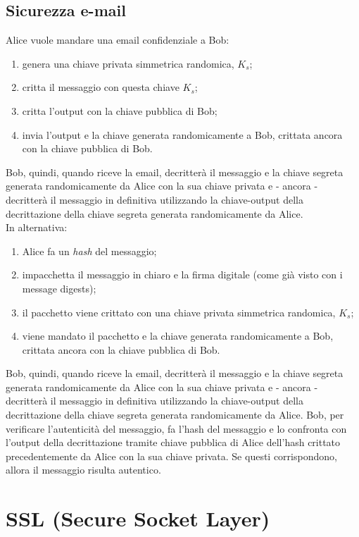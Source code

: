 \subsection{Sicurezza e-mail}
Alice vuole mandare una email confidenziale a Bob:
\begin{enumerate}
	\item genera una chiave privata simmetrica randomica, $K_{s}$;
	\item critta il messaggio con questa chiave $K_{s}$;
	\item critta l'output con la chiave pubblica di Bob;
	\item invia l'output e la chiave generata randomicamente a Bob, crittata ancora con la chiave pubblica di Bob.
\end{enumerate}
Bob, quindi, quando riceve la email, decritterà il messaggio e la chiave segreta generata randomicamente da Alice con la sua chiave privata e - ancora - decritterà il messaggio in definitiva utilizzando la chiave-output della decrittazione della chiave segreta generata randomicamente da Alice. \\
In alternativa:
\begin{enumerate}
	\item Alice fa un \textit{hash} del messaggio;
	\item impacchetta il messaggio in chiaro e la firma digitale (come già visto con i message digests);
	\item il pacchetto viene crittato con una chiave privata simmetrica randomica, $K_{s}$;
	\item viene mandato il pacchetto e la chiave generata randomicamente a Bob, crittata ancora con la chiave pubblica di Bob.
\end{enumerate}
Bob, quindi, quando riceve la email, decritterà il messaggio e la chiave segreta generata randomicamente da Alice con la sua chiave privata e - ancora - decritterà il messaggio in definitiva utilizzando la chiave-output della decrittazione della chiave segreta generata randomicamente da Alice. Bob, per verificare l'autenticità del messaggio, fa l'hash del messaggio e lo confronta con l'output della decrittazione tramite chiave pubblica di Alice dell'hash crittato precedentemente da Alice con la sua chiave privata. Se questi corrispondono, allora il messaggio risulta autentico.

\section{SSL (Secure Socket Layer)}

